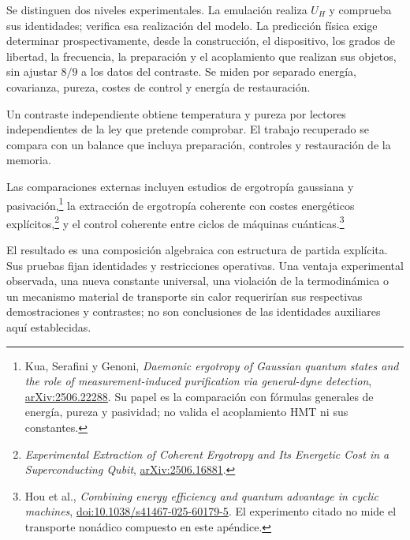 Se distinguen dos niveles experimentales. La emulación
realiza $U_H$ y comprueba sus identidades; verifica esa
realización del modelo. La predicción física exige
determinar prospectivamente, desde la construcción, el
dispositivo, los grados de libertad, la frecuencia, la
preparación y el acoplamiento que realizan sus objetos,
sin ajustar $8/9$ a los datos del contraste. Se miden
por separado energía, covarianza, pureza, costes de
control y energía de restauración.

Un contraste independiente obtiene temperatura y pureza
por lectores independientes de la ley que pretende
comprobar. El trabajo recuperado se compara con un
balance que incluya preparación, controles y restauración
de la memoria.

Las comparaciones externas incluyen estudios de
ergotropía gaussiana y pasivación,\footnote{Kua, Serafini
y Genoni, \emph{Daemonic ergotropy of Gaussian quantum
states and the role of measurement-induced purification
via general-dyne detection},
\href{https://arxiv.org/abs/2506.22288}{arXiv:2506.22288}.
Su papel es la comparación con fórmulas generales de
energía, pureza y pasividad; no valida el acoplamiento HMT
ni sus constantes.}
la extracción de ergotropía coherente con costes
energéticos explícitos,\footnote{\emph{Experimental
Extraction of Coherent Ergotropy and Its Energetic Cost
in a Superconducting Qubit},
\href{https://arxiv.org/abs/2506.16881}{arXiv:2506.16881}.}
y el control coherente entre ciclos de máquinas
cuánticas.\footnote{Hou et al., \emph{Combining energy
efficiency and quantum advantage in cyclic machines},
\href{https://doi.org/10.1038/s41467-025-60179-5}{doi:10.1038/s41467-025-60179-5}.
El experimento citado no mide el transporte nonádico
compuesto en este apéndice.}

El resultado es una composición algebraica con
estructura de partida explícita. Sus pruebas fijan
identidades y restricciones operativas. Una ventaja
experimental observada, una nueva constante universal,
una violación de la termodinámica o un mecanismo material
de transporte sin calor requerirían sus respectivas
demostraciones y contrastes; no son conclusiones de las
identidades auxiliares aquí establecidas.
